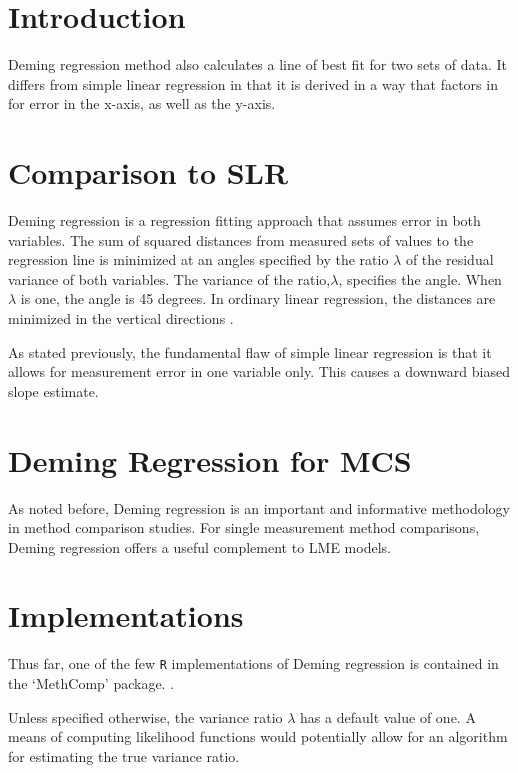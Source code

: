 \documentclass[12pt, a4paper]{report}
\theoremstyle{plain}
\theoremstyle{definition}
\theoremstyle{remark}
\begin{document}
\section{Introduction}

Deming regression method also calculates a line of best fit for two sets of data. It differs from simple linear regression in that it is derived in a way that factors in for error in the x-axis, as
well as the y-axis.

\section{Comparison to SLR}

Deming regression is a regression fitting approach that assumes error in both variables.
The sum of squared distances from measured sets of values to the regression line is minimized at an angles specified by the ratio $\lambda$ of the residual variance of both variables. The variance of the ratio,$\lambda$, specifies the angle.  When $\lambda$ is one, the angle is 45 degrees. In ordinary linear regression, the distances are minimized in the vertical directions \citep{linnet99}.

As stated previously, the fundamental flaw of simple linear regression is that it allows for measurement error in one variable only. This causes a downward biased slope estimate.



\section{Deming Regression for MCS}
As noted before, Deming regression is an important and informative methodology in method comparison studies.
For single measurement method comparisons, Deming regression offers a useful complement to LME models.

\section{Implementations}
Thus far, one of the few \texttt{R} implementations of Deming regression is contained in the `MethComp' package. \citep{BXC2008}.

Unless specified otherwise, the variance ratio $\lambda$ has a default value of one. A means of computing likelihood functions would potentially allow for an algorithm for estimating the true variance ratio.
\end{document}

